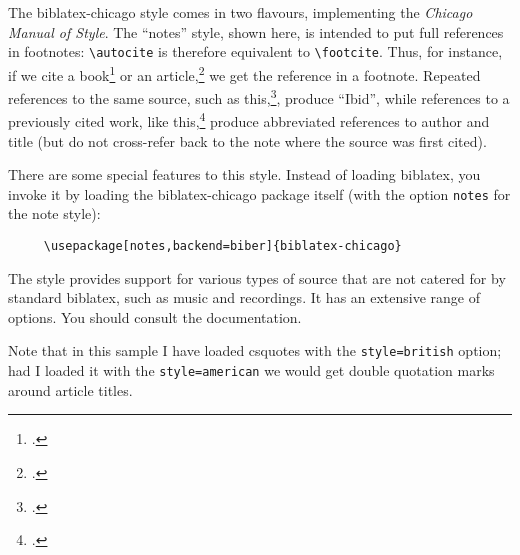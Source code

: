 
\usepackage[style=british]{csquotes}
\usepackage[notes,backend=biber]{biblatex-chicago}

\renewcommand{\showingstyle}{Chicago Notes}
%
The \textsf{biblatex-chicago} style comes in two flavours, implementing the \emph{Chicago Manual of Style}. The \enquote{notes} style, shown here, is intended to put full references in footnotes: \verb|\autocite| is therefore equivalent to \verb|\footcite|. Thus, for instance, if we cite a book\footcite{worman} or an article,\footcite{reese} we get the reference in a footnote. Repeated references to the same source, such as this,\footcite{reese}, produce \enquote{Ibid}, while references to a previously cited work, like this,\footcite{worman} produce abbreviated references to author and title (but do not cross-refer back to the note where the source was first cited).

There are some special features to this style. Instead of loading \textsf{biblatex}, you invoke it by loading the \textsf{biblatex-chicago} package itself (with the option \verb|notes| for the note style):
\begin{verbatim}
     \usepackage[notes,backend=biber]{biblatex-chicago}
\end{verbatim}
The style provides support for various types of source that are not catered for by standard \textsf{biblatex}, such as music and recordings. It has an extensive range of options. You should consult the documentation.

Note that in this sample I have loaded \textsf{csquotes} with the \verb~style=british~ option; had I loaded it with the \verb~style=american~ we would get double quotation marks around article titles.





